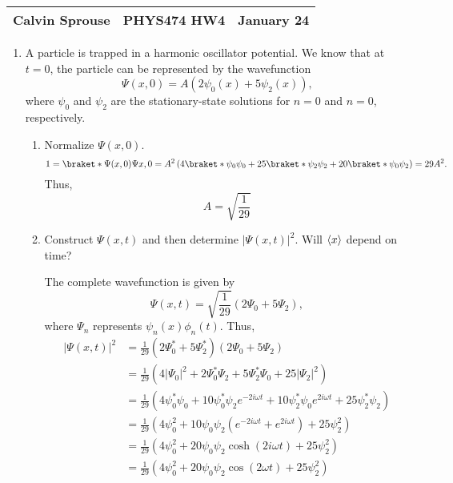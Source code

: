 \documentclass[a4paper, 12pt]{config/homework}
\begin{document}
\noindent
\begin{tabularx}{\textwidth}{>{\centering\arraybackslash}X>{\centering\arraybackslash}X>{\centering\arraybackslash}X}
Calvin Sprouse & PHYS474 HW4 & 2024 January 24\\
\midrule
\end{tabularx}

\begin{enumerate}
\item A particle is trapped in a harmonic oscillator potential. We know that at \(t=0\), the particle can be represented by the wavefunction
\[\Psi(x,0) = A\left(2\psi_0(x) + 5\psi_2(x)\right),\]
where \(\psi_0\) and \(\psi_2\) are the stationary-state solutions for \(n=0\) and \(n=0\), respectively.
\begin{enumerate}[label=(\alph*)]
\item Normalize \(\Psi(x,0)\).
\[1 = \braket*{\Psi(x,0)}{\Psi{x,0}}
= A^2 \left( 4 \braket*{\psi_0}{\psi_0} + 25 \braket*{\psi_2}{\psi_2} + 20\braket*{\psi_0}{\psi_2} \right)
= 29 A^2.\]
Thus, \[A = \sqrt{\frac{1}{29}}\]

\item Construct \(\Psi(x,t)\) and then determine \(\left|\Psi(x,t)\right|^2\). Will \(\left\langle x \right\rangle\) depend on time?

The complete wavefunction is given by
\[\Psi(x,t) = \sqrt{\frac{1}{29}} \left( 2 \Psi_0 + 5 \Psi_2 \right),\]
where \(\Psi_n\) represents \(\psi_n(x)\phi_n(t)\). Thus,
\begin{align*}
\left| \Psi(x,t) \right|^2 &= \frac{1}{29}\left(2\Psi_0^* + 5\Psi_2^*\right)\left(2\Psi_0 + 5\Psi_2\right)
\\&= \frac{1}{29}\left(4\left|\Psi_0\right|^2 + 2\Psi_0^*\Psi_2 + 5\Psi_2^*\Psi_0 + 25\left|\Psi_2\right|^2\right)
\\&= \frac{1}{29}\left(4\psi_0^*\psi_0
+ 10\psi_0^*\psi_2e^{-2i\omega t}
+ 10\psi_2^*\psi_0e^{2i\omega t}
+ 25\psi_2^*\psi_2\right)
\\&= \frac{1}{29}\left(4\psi_0^2
+ 10\psi_0\psi_2\left(e^{-2i\omega t} + e^{2i\omega t}\right)
+ 25\psi_2^2\right)
\\&= \frac{1}{29}\left(4\psi_0^2
+ 20\psi_0\psi_2\cosh(2i\omega t)
+ 25\psi_2^2\right)
\\&= \frac{1}{29}\left(4\psi_0^2
+ 20\psi_0\psi_2\cos(2\omega t)
+ 25\psi_2^2\right)
\end{align*}


\end{enumerate}
\end{enumerate}
\end{document}
